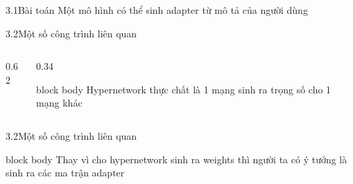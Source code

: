 \begin{frame}{3.1\quad Bài toán}
  \centering
  \vspace{0.3em}
  {\large Một mô hình có thể sinh adapter từ mô tả của người dùng}\par
  \vspace{0.3em}{\color{Rule}\rule{0.9\linewidth}{0.8pt}}\par\vspace{0.8em}
\end{frame}

\begin{frame}{3.2\quad Một số công trình liên quan}
  \vspace{0.6em}
  \begin{columns}[c,onlytextwidth]
    \begin{column}{0.62\textwidth}
      \centering{}
    \end{column}
    \begin{column}{0.34\textwidth}
      \begin{beamercolorbox}[wd=\linewidth,sep=0.7em]{block body}
        \large Hypernetwork thực chất là 1 mạng sinh ra trọng số cho 1 mạng khác
      \end{beamercolorbox}
    \end{column}
  \end{columns}
\end{frame}

\begin{frame}{3.2\quad Một số công trình liên quan}
  \centering
  \par\vspace{0.8em}
  \begin{beamercolorbox}[wd=0.9\linewidth,sep=0.6em]{block body}
    \centering Thay vì cho hypernetwork sinh ra weights thì người ta có ý tưởng là sinh ra
    các ma trận adapter
  \end{beamercolorbox}
\end{frame}

